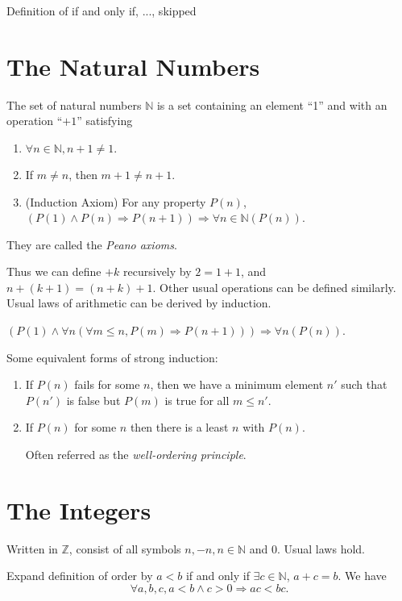 \documentclass[10pt]{article}
\renewcommand{\le}{\leqslant}
\begin{document}
	Definition of if and only if, ..., skipped

	\section{The Natural Numbers}
	\begin{definition}
		The set of natural numbers $ \mathbb{N} $ is a set containing an element “1” and with an operation “$+1$” satisfying
		\begin{enumerate}[(1)]
			\item $ \forall n\in \mathbb{N}, n+1\neq 1. $
			\item If $ m\neq n $, then $ m+1\neq n+1. $ 
			\item (Induction Axiom) For any property $P(n)$, $ (P(1)\land P(n)\Rightarrow P(n+1)) \Rightarrow \forall n\in \mathbb{N} (P(n))$.
		\end{enumerate}
		They are called the \textit{Peano axioms}.
	\end{definition}
	Thus we can define $ +k $ recursively by $ 2=1+1 $, and $ n+(k+1)=(n+k)+1 $. Other usual operations can be defined similarly. Usual laws of arithmetic can be derived by induction.
	\begin{proposition}\label{prop:strong_induction}
		$(P(1) \land \forall n (\forall m\le n, P(m) \Rightarrow P(n+1))) \Rightarrow \forall n(P(n))$.
	\end{proposition}
	\begin{remark}
		Some equivalent forms of strong induction:
		\begin{enumerate}
			\item If $P(n)$ fails for some $n$, then we have a minimum element $n'$ such that $P(n')$ is false but $P(m)$ is true for all $m\le n'$.
			\item If $P(n)$ for some $n$ then there is a least $n$ with $P(n)$.

			Often referred as the \textit{well-ordering principle}.
		\end{enumerate}
	\end{remark}
	\section{The Integers}
	Written in $ \mathbb{Z} $, consist of all symbols $n,-n,n\in \mathbb{N}$ and 0. Usual laws hold.

	Expand definition of order by $ a<b $ if and only if $ \exists c\in \mathbb{N} $, $a+c=b$. We have
	\[
		\forall a,b,c, a<b \land c>0 \Longrightarrow ac<bc
	.\]
\end{document}
